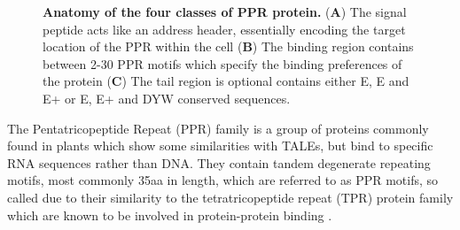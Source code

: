 \begin{figure}
\begin{center}
  \end{center}
  \caption[LoF entry]{
    \textbf{Anatomy of the four classes of PPR protein.}
    (\textbf{A}) The signal peptide acts like an address header, essentially 
      encoding the target location of the PPR within the cell
    (\textbf{B}) The binding region contains between 2-30 PPR motifs which 
      specify the binding preferences of the protein
    (\textbf{C}) The tail region is optional contains either E, E and E+ or 
      E, E+ and DYW conserved sequences.
  }
  \label{fig:ppr_anatomy}
\end{figure}

The Pentatricopeptide Repeat (PPR) family is a group of proteins commonly found 
in plants which show some
similarities with TALEs, but bind to specific RNA sequences rather than DNA.
They contain tandem degenerate repeating motifs, most commonly 35aa in length,
which are referred to as PPR motifs, so called due to their similarity to the 
tetratricopeptide repeat (TPR) 
protein family which are known to be involved in protein-protein binding 
\citep{Small2000}.

